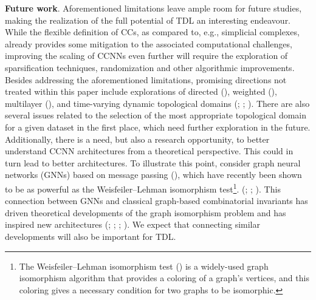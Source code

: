 \documentclass[
  12pt,
]{krantz}
\begin{document}
\textbf{Future work}. Aforementioned limitations leave ample room for
future studies, making the realization of the full potential of TDL an
interesting endeavour. While the flexible definition of CCs, as compared
to, e.g., simplicial complexes, already provides some mitigation to the
associated computational challenges, improving the scaling of CCNNs even
further will require the exploration of sparsification techniques,
randomization and other algorithmic improvements. Besides addressing the
aforementioned limitations, promising directions not treated within this
paper include explorations of directed
(), weighted
(),
multilayer (), and time-varying dynamic topological domains
(;
;
). There are also several
issues related to the selection of the most appropriate topological
domain for a given dataset in the first place, which need further
exploration in the future. Additionally, there is a need, but also a
research opportunity, to better understand CCNN architectures from a
theoretical perspective. This could in turn lead to better
architectures. To illustrate this point, consider graph neural networks
(GNNs) based on message passing (), which have recently been shown to be as powerful as the
Weisfeiler--Lehman isomorphism test\footnote{The Weisfeiler--Lehman
  isomorphism test () is a widely-used graph isomorphism algorithm that
  provides a coloring of a graph's vertices, and this coloring gives a
  necessary condition for two graphs to be isomorphic.}.
(;
;
). This
connection between GNNs and classical graph-based combinatorial
invariants has driven theoretical developments of the graph isomorphism
problem and has inspired new architectures
(;
;
;
). We expect
that connecting similar developments will also be important for TDL.
\end{document}

